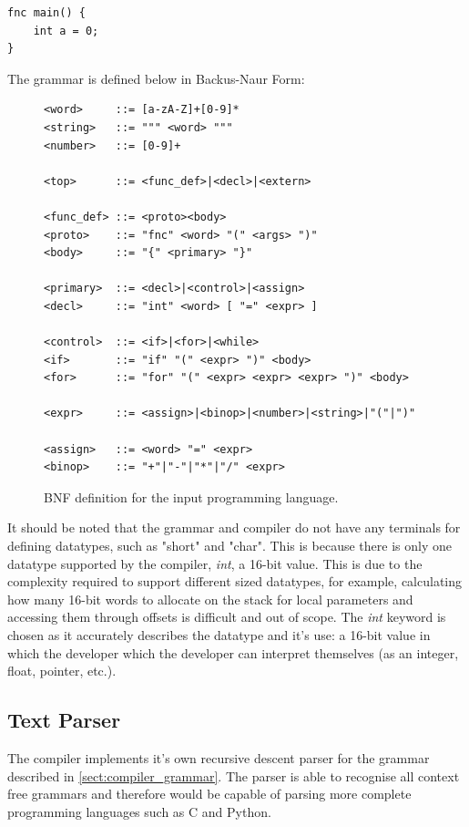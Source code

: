 \documentclass[11pt,a4paper]{report}
\begin{document}
\begin{verbatim}
fnc main() {
    int a = 0;
}
\end{verbatim}

The grammar is defined below in Backus-Naur Form:
\begin{figure}[H]
\begin{verbatim}
<word>     ::= [a-zA-Z]+[0-9]*
<string>   ::= """ <word> """
<number>   ::= [0-9]+

<top>      ::= <func_def>|<decl>|<extern>

<func_def> ::= <proto><body>
<proto>    ::= "fnc" <word> "(" <args> ")" 
<body>     ::= "{" <primary> "}"

<primary>  ::= <decl>|<control>|<assign>
<decl>     ::= "int" <word> [ "=" <expr> ]

<control>  ::= <if>|<for>|<while>
<if>       ::= "if" "(" <expr> ")" <body>
<for>      ::= "for" "(" <expr> <expr> <expr> ")" <body>

<expr>     ::= <assign>|<binop>|<number>|<string>|"("|")"

<assign>   ::= <word> "=" <expr>
<binop>    ::= "+"|"-"|"*"|"/" <expr>
\end{verbatim}
\label{fig:compiler_grammar_bnf}
\caption{BNF definition for the input programming language.}
\end{figure}

It should be noted that the grammar and compiler do not have any terminals for defining datatypes, such as "short" and "char". This is because there is only one datatype supported by the compiler, \textit{int}, a 16-bit value. This is due to the complexity required to support different sized datatypes, for example, calculating how many 16-bit words to allocate on the stack for local parameters and accessing them through offsets is difficult and out of scope. The \textit{int} keyword is chosen as it accurately describes the datatype and it's use: a 16-bit value in which the developer which the developer can interpret themselves (as an integer, float, pointer, etc.).

\subsection{Text Parser}
The compiler implements it's own recursive descent parser for the grammar described in \ref{sect:compiler_grammar}. The parser is able to recognise all context free grammars and therefore would be capable of parsing more complete programming languages such as C and Python. 
\end{document}
